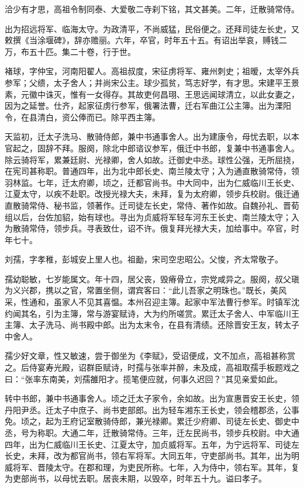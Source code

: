 \documentclass[12pt,UTF8]{ctexbook}
\begin{document}
洽少有才思，高祖令制同泰、大爱敬二寺刹下铭，其文甚美。二年，迁散骑常侍。

出为招远将军、临海太守。为政清平，不尚威猛，民俗便之。还拜司徒左长史，又敕撰《当涂堰碑》，辞亦赡丽。六年，卒官，时年五十五。有诏出举哀，赙钱二万，布五十匹。集二十卷，行于世。

褚球，字仲宝，河南阳翟人。高祖叔度，宋征虏将军、雍州刺史；祖暧，太宰外兵参军；父缋，太子舍人；并尚宋公主。球少孤贫，笃志好学，有才思。宋建平王景素，元徽中诛灭，惟有一女得存。其故吏何昌珝、王思远闻球清立，以此女妻之，因为之延誉。仕齐，起家征虏行参军，俄署法曹，迁右军曲江公主簿。出为溧阳令，在县清白，资公俸而已。除平西主簿。

天监初，迁太子洗马、散骑侍郎，兼中书通事舍人。出为建康令，母忧去职，以本官起之，固辞不拜。服阕，除北中郎谘议参军，俄迁中书郎，复兼中书通事舍人。除云骑将军，累兼廷尉、光禄卿，舍人如故。迁御史中丞。球性公强，无所屈挠，在宪司甚称职。普通四年，出为北中郎长史、南兰陵太守；入为通直散骑常侍，领羽林监。七年，迁太府卿，顷之，迁都官尚书。中大同中，出为仁威临川王长史、江夏太守，以疾不赴职。改授光禄大夫，未拜，复为太府卿，领步兵校尉。俄迁通直散骑常侍、秘书监，领著作。迁司徒左长史，常侍、著作如故。自魏孙礼、晋荀组以后，台佐加貂，始有球也。寻出为贞威将军轻车河东王长史、南兰陵太守；入为散骑常侍，领步兵。寻表致仕，诏不许。俄复拜光禄大夫，加给事中。卒官，时年七十。

刘孺，字孝稚，彭城安上里人也。祖勔，宋司空忠昭公。父悛，齐太常敬子。

孺幼聪敏，七岁能属文。年十四，居父丧，毁瘠骨立，宗党咸异之。服阕，叔父瑱为义兴郡，携以之官，常置坐侧，谓宾客曰：“此儿吾家之明珠也。”既长，美风采，性通和，虽家人不见其喜愠。本州召迎主簿。起家中军法曹行参军。时镇军沈约闻其名，引为主簿，常与游宴赋诗，大为约所嗟赏。累迁太子舍人、中军临川王主簿、太子洗马、尚书殿中郎。出为太末令，在县有清绩。还除晋安王友，转太子中舍人。

孺少好文章，性又敏速，尝于御坐为《李赋》，受诏便成，文不加点，高祖甚称赏之。后侍宴寿光殿，诏群臣赋诗，时孺与张率并醉，未及成，高祖取孺手板题戏之曰：“张率东南美，刘孺雒阳才。揽笔便应就，何事久迟回？”其见亲爱如此。

转中书郎，兼中书通事舍人。顷之迁太子家令，余如故。出为宣惠晋安王长史，领丹阳尹丞。迁太子中庶子、尚书吏部郎。出为轻车湘东王长史，领会稽郡丞，公事免。顷之，起为王府记室散骑侍郎，兼光禄卿。累迁少府卿、司徒左长史、御史中丞，号为称职。大通二年，迁散骑常侍。三年，迁左民尚书，领步兵校尉。中大通四年，出为仁威临川王长史、江夏太守，加贞威将军。五年，为宁远将军、司徒左长史，未拜，改为都官尚书，领右军将军。大同五年，守吏部尚书。其年，出为明威将军、晋陵太守。在郡和理，为吏民所称。七年，入为侍中，领右军。其年，复为吏部尚书，以母忧去职。居丧未期，以毁卒，时年五十九。谥曰孝子。
\end{document}
